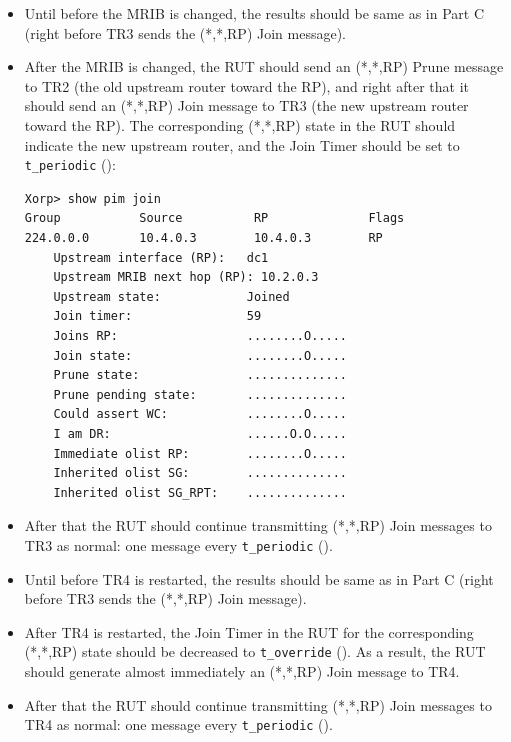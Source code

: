 \documentclass[11pt]{report}
\begin{document}
\begin{itemize}

  \item Until before the MRIB is changed, the results should
  be same as in Part C (right before TR3 sends the (*,*,RP) Join message).

  \item After the MRIB is changed, the RUT should send an (*,*,RP) Prune
  message to TR2 (the old upstream router toward the RP), and right after that
  it should send an (*,*,RP) Join message to TR3 (the new upstream router
  toward the RP). The corresponding (*,*,RP) state in the RUT should
  indicate the new upstream router, and the Join Timer should be set
  to \verb=t_periodic= ({\PimsmTPeriodic}):

\begin{verbatim}
Xorp> show pim join 
Group           Source          RP              Flags
224.0.0.0       10.4.0.3        10.4.0.3        RP   
    Upstream interface (RP):   dc1
    Upstream MRIB next hop (RP): 10.2.0.3
    Upstream state:            Joined 
    Join timer:                59
    Joins RP:                  ........O.....
    Join state:                ........O.....
    Prune state:               ..............
    Prune pending state:       ..............
    Could assert WC:           ........O.....
    I am DR:                   ......O.O.....
    Immediate olist RP:        ........O.....
    Inherited olist SG:        ..............
    Inherited olist SG_RPT:    ..............
\end{verbatim}

  \item After that the RUT should continue transmitting 
  (*,*,RP) Join messages to TR3 as normal: one message every \verb=t_periodic=
  ({\PimsmTPeriodic}).

\end{itemize}


\begin{itemize}

  \item Until before TR4 is restarted, the results should
  be same as in Part C (right before TR3 sends the (*,*,RP) Join message).

  \item After TR4 is restarted,
  the Join Timer in the RUT for the corresponding (*,*,RP) state
  should be decreased to \verb=t_override= ({\PimsmTOverride}). As a result,
  the RUT should generate almost immediately an (*,*,RP) Join message to TR4.

  \item After that the RUT should continue transmitting 
  (*,*,RP) Join messages to TR4 as normal: one message every \verb=t_periodic=
  ({\PimsmTPeriodic}).

\end{itemize}
\end{document}
